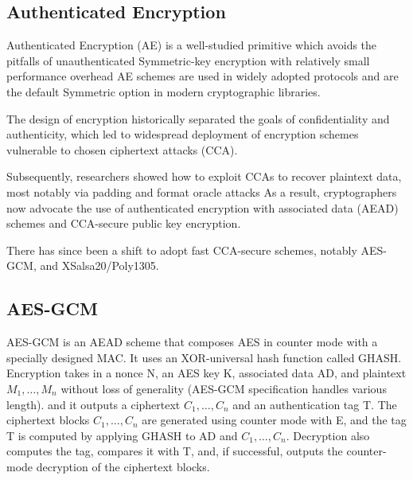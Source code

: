 \subsection*{Authenticated Encryption}\label{subsec:authenticated-encryption}
Authenticated Encryption (AE)\cite{rfc5116} is a well-studied primitive which avoids the pitfalls of unauthenticated
Symmetric-key encryption with relatively small performance overhead
AE schemes are used in widely adopted protocols and are the default Symmetric option in modern cryptographic libraries.

The design of encryption historically separated the goals of confidentiality and authenticity, which led to widespread
deployment of encryption schemes vulnerable to chosen ciphertext attacks (CCA).

Subsequently, researchers showed how to exploit CCAs to recover plaintext data, most notably via padding and
format oracle attacks
As a result, cryptographers now advocate the use of authenticated encryption with associated data (AEAD) schemes and CCA-secure
public key encryption.

There has since been a shift to adopt fast CCA-secure schemes, notably AES-GCM, and XSalsa20/Poly1305.
\subsection*{AES-GCM}\label{subsec:aes-gcm}
AES-GCM is an AEAD scheme that composes AES in counter mode with a specially designed MAC.
It uses an XOR-universal hash function called GHASH.
Encryption takes in a nonce N, an AES key K, associated data AD, and plaintext $M_{1},\ldots,M_{n}$ without loss of generality (AES-GCM specification handles various length).
and it outputs a ciphertext $C_{1},\ldots,C_{n}$ and an authentication tag T.
The ciphertext blocks $C_{1},\ldots,C_{n}$ are generated using counter mode with E, and the tag T
is computed by applying GHASH to AD and $C_{1},\ldots,C_{n}$.
Decryption also computes the tag, compares it with T, and, if successful, outputs the counter-mode decryption of the ciphertext
blocks.